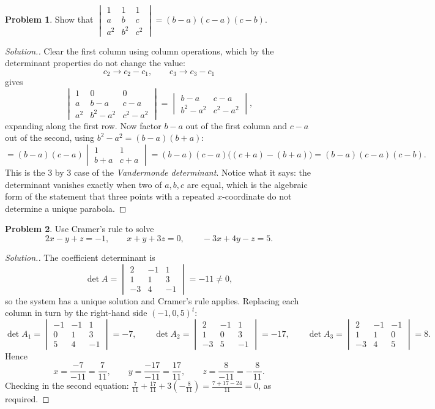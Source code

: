 \documentclass[11pt,a4paper]{article}
\theoremstyle{definition}
\newtheorem{problemx}{Problem}[section]
\newenvironment{problem}{\begin{problemx}}{\end{problemx}}
\newenvironment{solution}
  {\renewcommand{\qedsymbol}{}\begin{proof}[\textit{Solution}.]}
  {\end{proof}}
\begin{document}
\begin{problem}
Show that
$\begin{vmatrix}1&1&1\\a&b&c\\a^2&b^2&c^2\end{vmatrix}=(b-a)(c-a)(c-b)$.
\end{problem}
\begin{solution}
Clear the first column using column operations, which by the determinant
properties do not change the value:
$$c_2\rightarrow c_2-c_1,\qquad c_3\rightarrow c_3-c_1$$
gives
$$\begin{vmatrix}1&0&0\\a&b-a&c-a\\a^2&b^2-a^2&c^2-a^2\end{vmatrix}
=\begin{vmatrix}b-a&c-a\\b^2-a^2&c^2-a^2\end{vmatrix},$$
expanding along the first row. Now factor $b-a$ out of the first column and
$c-a$ out of the second, using $b^2-a^2=(b-a)(b+a)$:
$$=(b-a)(c-a)\begin{vmatrix}1&1\\b+a&c+a\end{vmatrix}
=(b-a)(c-a)\big((c+a)-(b+a)\big)=(b-a)(c-a)(c-b).$$
This is the $3$ by $3$ case of the \emph{Vandermonde determinant}. Notice what
it says: the determinant vanishes exactly when two of $a,b,c$ are equal, which
is the algebraic form of the statement that three points with a repeated
$x$-coordinate do not determine a unique parabola.
\end{solution}

\begin{problem}
Use Cramer's rule to solve
$$2x-y+z=-1,\qquad x+y+3z=0,\qquad -3x+4y-z=5.$$
\end{problem}
\begin{solution}
The coefficient determinant is
$$\det A=\begin{vmatrix}2&-1&1\\1&1&3\\-3&4&-1\end{vmatrix}=-11\neq 0,$$
so the system has a unique solution and Cramer's rule applies. Replacing each
column in turn by the right-hand side $(-1,0,5)^t$:
$$\det A_1=\begin{vmatrix}-1&-1&1\\0&1&3\\5&4&-1\end{vmatrix}=-7,\qquad
  \det A_2=\begin{vmatrix}2&-1&1\\1&0&3\\-3&5&-1\end{vmatrix}=-17,\qquad
  \det A_3=\begin{vmatrix}2&-1&-1\\1&1&0\\-3&4&5\end{vmatrix}=8.$$
Hence
$$x=\frac{-7}{-11}=\frac{7}{11},\qquad y=\frac{-17}{-11}=\frac{17}{11},\qquad
  z=\frac{8}{-11}=-\frac{8}{11}.$$
Checking in the second equation:
$\frac{7}{11}+\frac{17}{11}+3\left(-\frac{8}{11}\right)
=\frac{7+17-24}{11}=0$, as required.
\end{solution}
\end{document}

